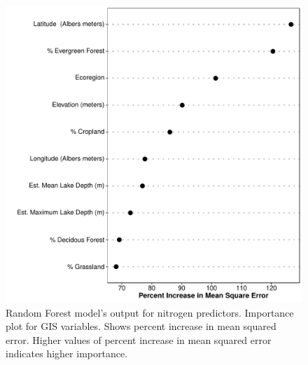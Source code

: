 \documentclass[fleqn,10pt]{wlpeerj} %
\begin{document}
\begin{figure}
  \includegraphics[width=\textwidth]{importanceplot_gis_PTL.pdf}
  \caption{Random Forest model's output for nitrogen predictors. Importance plot for GIS variables. Shows percent increase in mean squared error. Higher values of percent increase in mean squared error indicates higher importance.}
  \label{fig:importancePlot_gis_PTL}
\end{figure}
\end{document}
